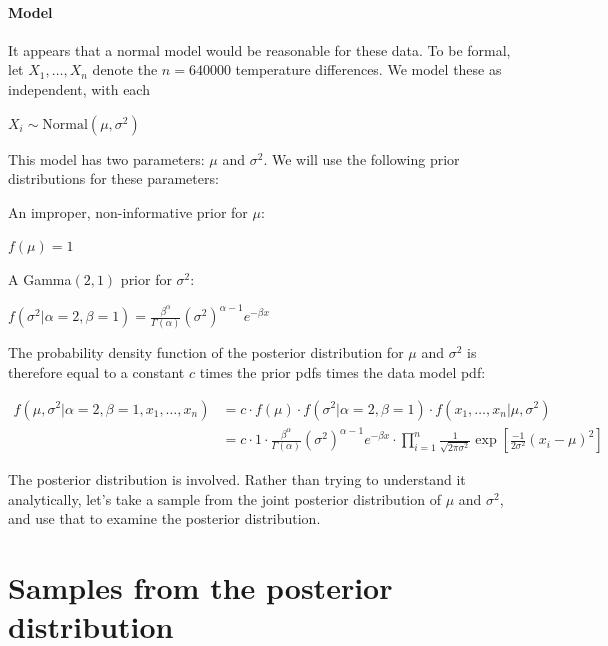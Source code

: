 \documentclass[]{article}
\let\oldparagraph\paragraph
\renewcommand{\paragraph}[1]{\oldparagraph{#1}\mbox{}}
\begin{document}
\paragraph{Model}\label{model}

It appears that a normal model would be reasonable for these data. To be
formal, let \(X_1, \ldots, X_n\) denote the \(n = 640000\) temperature
differences. We model these as independent, with each

\(X_i \sim \text{Normal}(\mu, \sigma^2)\)

This model has two parameters: \(\mu\) and \(\sigma^2\). We will use the
following prior distributions for these parameters:

An improper, non-informative prior for \(\mu\):

\(f(\mu) = 1\)

A Gamma\((2, 1)\) prior for \(\sigma^2\):

\(f(\sigma^2 | \alpha = 2, \beta = 1) = \frac{\beta^\alpha}{\Gamma(\alpha)}(\sigma^2)^{\alpha - 1}e^{-\beta x}\)

The probability density function of the posterior distribution for
\(\mu\) and \(\sigma^2\) is therefore equal to a constant \(c\) times
the prior pdfs times the data model pdf:

\begin{align*}
f(\mu, \sigma^2 | \alpha = 2, \beta = 1, x_1, \ldots, x_n) &= c \cdot f(\mu) \cdot f(\sigma^2 | \alpha = 2, \beta = 1) \cdot f(x_1, \ldots, x_n | \mu, \sigma^2) \\
&= c \cdot 1 \cdot \frac{\beta^\alpha}{\Gamma(\alpha)}(\sigma^2)^{\alpha - 1}e^{-\beta x} \cdot \prod_{i=1}^n \frac{1}{\sqrt{2 \pi \sigma^2}} \exp\left[ \frac{-1}{2 \sigma^2} (x_i - \mu)^2 \right]
\end{align*}

The posterior distribution is involved. Rather than trying to understand
it analytically, let's take a sample from the joint posterior
distribution of \(\mu\) and \(\sigma^2\), and use that to examine the
posterior distribution.

\section{Samples from the posterior
distribution}\label{samples-from-the-posterior-distribution}
\end{document}
